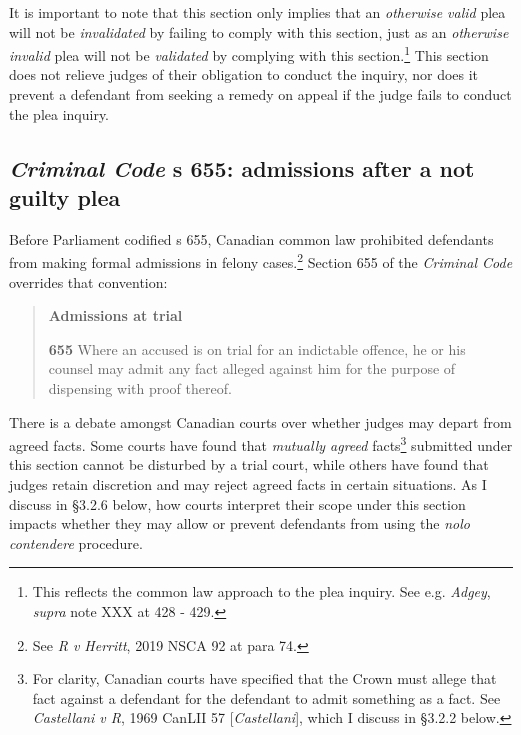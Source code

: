 It is important to note that this section only implies that an \textit{otherwise valid} plea will not be \textit{invalidated} by failing to comply with this section, just as an \textit{otherwise invalid} plea will not be \textit{validated} by complying with this section.\footnote{This reflects the common law approach to the plea inquiry. See e.g. \textit{Adgey}, \textit{supra} note XXX at 428 - 429.} This section does not relieve judges of their obligation to conduct the inquiry, nor does it prevent a defendant from seeking a remedy on appeal if the judge fails to conduct the plea inquiry.

\subsection{\textit{Criminal Code} s 655: admissions after a not guilty plea}

Before Parliament codified s 655, Canadian common law prohibited defendants from making formal admissions in felony cases.\footnote{See \textit{R v Herritt}, 2019 NSCA 92 at para 74.} Section 655 of the \textit{Criminal Code} overrides that convention:

\begin{quote}
    \singlespacing
    \textbf{Admissions at trial}
    
    \textbf{655} Where an accused is on trial for an indictable offence, he or his counsel may admit any fact alleged against him for the purpose of dispensing with proof thereof.
\end{quote}

There is a debate amongst Canadian courts over whether judges may depart from agreed facts. Some courts have found that \textit{mutually agreed} facts\footnote{For clarity, Canadian courts have specified that the Crown must allege that fact against a defendant for the defendant to admit something as a fact. See \textit{Castellani v R}, 1969 CanLII 57 [\textit{Castellani}], which I discuss in \S 3.2.2 below.} submitted under this section cannot be disturbed by a trial court, while others have found that judges retain discretion and may reject agreed facts in certain situations. As I discuss in \S 3.2.6 below, how courts interpret their scope under this section impacts whether they may allow or prevent defendants from using the \textit{nolo contendere} procedure.